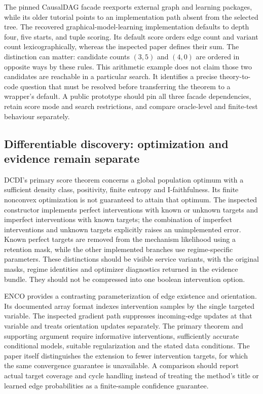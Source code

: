 The pinned CausalDAG facade reexports external graph and learning packages,
while its older tutorial points to an implementation path absent from the
selected tree. The recovered graphical-model-learning implementation
defaults to depth four, five starts, and tuple scoring. Its default score
orders edge count and variant count lexicographically, whereas the
inspected paper defines their sum. The distinction can matter: candidate
counts $(3,5)$ and $(4,0)$ are ordered in opposite ways by these rules.
This arithmetic example does not claim those two candidates are reachable
in a particular search. It identifies a precise theory-to-code question
that must be resolved before transferring the theorem to a wrapper's
default. A public prototype should pin all three facade dependencies,
retain score mode and search restrictions, and compare oracle-level and
finite-test behaviour separately. \citep{exec14_pt_causaldag,exec14_pt_gml,
exec14_pt_paper_utigsp,exec14_pt_exact}

\subsection{Differentiable discovery: optimization and evidence remain separate}

DCDI's primary score theorem concerns a global population optimum with a
sufficient density class, positivity, finite entropy and I-faithfulness.
Its finite nonconvex optimization is not guaranteed to attain that optimum.
The inspected constructor implements perfect interventions with known or
unknown targets and imperfect interventions with known targets; the
combination of imperfect interventions and unknown targets explicitly raises an unimplemented error.
Known perfect targets are removed from the mechanism likelihood using a
retention mask, while the other implemented branches use regime-specific
parameters. These distinctions should be visible service variants, with
the original masks, regime identities and optimizer diagnostics returned
in the evidence bundle. They should not be compressed into one boolean
intervention option. \citep{exec14_pt_paper_dcdi,exec14_pt_dcdi}

ENCO provides a contrasting parameterization of edge existence and
orientation. Its documented array format indexes intervention samples by
the single targeted variable. The inspected gradient path suppresses
incoming-edge updates at that variable and treats orientation updates
separately. The primary theorem and supporting argument require informative
interventions, sufficiently accurate conditional models, suitable
regularization and the stated data conditions. The paper itself distinguishes
the extension to fewer intervention targets, for which the same convergence
guarantee is unavailable. A comparison should report actual target coverage
and cycle handling instead of treating the method's title or learned edge
probabilities as a finite-sample confidence guarantee.
\citep{exec14_pt_enco,exec14_pt_paper_enco}

